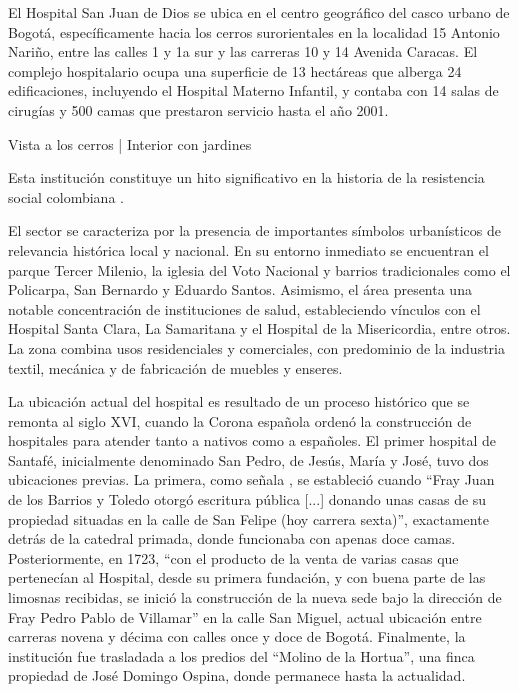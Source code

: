 El Hospital San Juan de Dios se ubica en el centro geográfico del casco urbano de Bogotá, específicamente hacia los cerros surorientales en la localidad 15 Antonio Nariño, entre las calles 1 y 1a sur y las carreras 10 y 14 Avenida Caracas. El complejo hospitalario ocupa una superficie de 13 hectáreas que alberga 24 edificaciones, incluyendo el Hospital Materno Infantil, y contaba con 14 salas de cirugías y 500 camas que prestaron servicio hasta el año 2001. 

Vista a los cerros | Interior con jardines

Esta institución constituye un hito significativo en la historia de la resistencia social colombiana \parencite{Gongora2013}.

El sector se caracteriza por la presencia de importantes símbolos urbanísticos de relevancia histórica local y nacional. En su entorno inmediato se encuentran el parque Tercer Milenio, la iglesia del Voto Nacional y barrios tradicionales como el Policarpa, San Bernardo y Eduardo Santos. Asimismo, el área presenta una notable concentración de instituciones de salud, estableciendo vínculos con el Hospital Santa Clara, La Samaritana y el Hospital de la Misericordia, entre otros. La zona combina usos residenciales y comerciales, con predominio de la industria textil, mecánica y de fabricación de muebles y enseres.

La ubicación actual del hospital es resultado de un proceso histórico que se remonta al siglo XVI, cuando la Corona española ordenó la construcción de hospitales para atender tanto a nativos como a españoles. El primer hospital de Santafé, inicialmente denominado San Pedro, de Jesús, María y José, tuvo dos ubicaciones previas. La primera, como señala \parencite{Romero1994}, se estableció cuando \enquote{Fray Juan de los Barrios y Toledo otorgó escritura pública [...] donando unas casas de su propiedad situadas en la calle de San Felipe (hoy carrera sexta)}, exactamente detrás de la catedral primada, donde funcionaba con apenas doce camas. Posteriormente, en 1723, \enquote{con el producto de la venta de varias casas que pertenecían al Hospital, desde su primera fundación, y con buena parte de las limosnas recibidas, se inició la construcción de la nueva sede bajo la dirección de Fray Pedro Pablo de Villamar} en la calle San Miguel, actual ubicación entre carreras novena y décima con calles once y doce de Bogotá. Finalmente, la institución fue trasladada a los predios del \enquote{Molino de la Hortua}, una finca propiedad de José Domingo Ospina, donde permanece hasta la actualidad.

